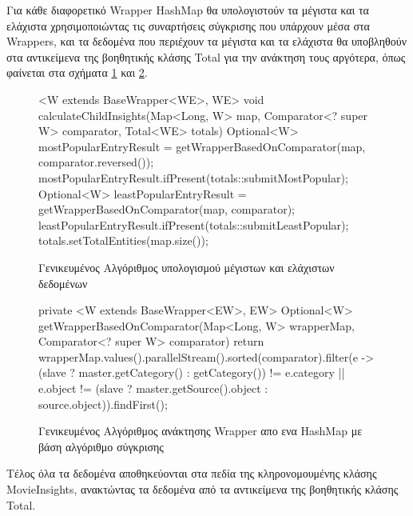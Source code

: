 Για κάθε διαφορετικό Wrapper HashMap θα υπολογιστούν τα μέγιστα και τα ελάχιστα χρησιμοποιώντας τις συναρτήσεις σύγκρισης που υπάρχουν μέσα στα Wrappers, και τα δεδομένα που περιέχουν τα μέγιστα και τα ελάχιστα θα υποβληθούν στα αντικείμενα της βοηθητικής κλάσης Total για την ανάκτηση τους αργότερα, όπως φαίνεται στα σχήματα \ref{code:calculateChildInsights} και \ref{code:getWrapperBasedOnComparator}.

\begin{figure}[h]
    \begin{javacode}
<W extends BaseWrapper<WE>, WE> void calculateChildInsights(Map<Long, W> map, Comparator<? super W> comparator, Total<WE> totals) {
    Optional<W> mostPopularEntryResult = getWrapperBasedOnComparator(map, comparator.reversed());
    mostPopularEntryResult.ifPresent(totals::submitMostPopular);
    Optional<W> leastPopularEntryResult = getWrapperBasedOnComparator(map, comparator);
    leastPopularEntryResult.ifPresent(totals::submitLeastPopular);
    totals.setTotalEntities(map.size());
}
    \end{javacode}
    \caption{Γενικευμένος Αλγόριθμος υπολογισμού μέγιστων και ελάχιστων δεδομένων}
    \label{code:calculateChildInsights}
\end{figure}
\begin{figure}[h]
    \begin{javacode}
private <W extends BaseWrapper<EW>, EW> Optional<W> getWrapperBasedOnComparator(Map<Long, W> wrapperMap, Comparator<? super W> comparator) {
    return wrapperMap.values().parallelStream().sorted(comparator).filter(e -> (slave ? master.getCategory() : getCategory()) != e.category || e.object != (slave ? master.getSource().object : source.object)).findFirst();
}
    \end{javacode}
    \caption{Γενικευμένος Αλγόριθμος ανάκτησης Wrapper απο ενα HashMap με βάση αλγόριθμο σύγκρισης}
    \label{code:getWrapperBasedOnComparator}
\end{figure}

Τέλος όλα τα δεδομένα αποθηκεύονται στα πεδία της κληρονομουμένης κλάσης MovieInsights, ανακτώντας τα δεδομένα από τα αντικείμενα της βοηθητικής κλάσης Total.

